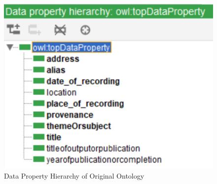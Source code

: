 \begin{figure}[H]
    \centering
    \includegraphics[width=0.5\linewidth]{figures/Data Property Hierarchy of Original Ontology.png}
    \caption{Data Property Hierarchy of Original Ontology}
    \label{fig:data property hierarchy}
\end{figure}

\FloatBarrier